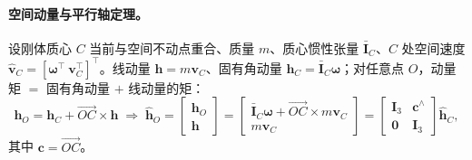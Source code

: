 \paragraph{空间动量与平行轴定理。}
设刚体质心 $C$ 当前与空间不动点重合、质量 $m$、质心惯性张量 $\bar{\mathbf{I}}_C$、$C$ 处空间速度 $\hat{\boldsymbol{v}}_C=[\boldsymbol{\omega}^\top\ \boldsymbol{v}_C^\top]^\top$。线动量 $\boldsymbol{h}=m\boldsymbol{v}_C$、固有角动量 $\boldsymbol{h}_C=\bar{\mathbf{I}}_C\boldsymbol{\omega}$；对任意点 $O$，动量矩 $=$ 固有角动量 $+$ 线动量的矩\cite{yu2021quadruped}：
\begin{equation}
  \boldsymbol{h}_O=\boldsymbol{h}_C+\overrightarrow{OC}\times\boldsymbol{h}
  \;\Longrightarrow\;
  \hat{\boldsymbol{h}}_O=\begin{bmatrix}\boldsymbol{h}_O\\\boldsymbol{h}\end{bmatrix}
  =\begin{bmatrix}\bar{\mathbf{I}}_C\boldsymbol{\omega}+\overrightarrow{OC}\times m\boldsymbol{v}_C\\ m\boldsymbol{v}_C\end{bmatrix}
  =\begin{bmatrix}\mathbf{I}_3&\boldsymbol{c}^{\wedge}\\\mathbf{0}&\mathbf{I}_3\end{bmatrix}\hat{\boldsymbol{h}}_C,
  \label{eq:qk-spatial-momentum}
\end{equation}
其中 $\boldsymbol{c}=\overrightarrow{OC}$。

